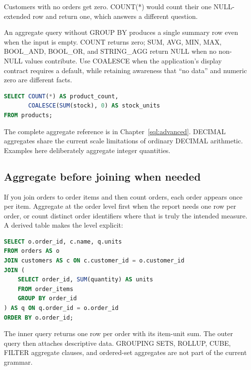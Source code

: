 Customers with no orders get zero. COUNT(*) would count their one NULL-extended row and return one, which answers a different question.

An aggregate query without GROUP BY produces a single summary row even when the input is empty. COUNT returns zero; SUM, AVG, MIN, MAX, BOOL\_AND, BOOL\_OR, and STRING\_AGG return NULL when no non-NULL values contribute. Use COALESCE when the application's display contract requires a default, while retaining awareness that ``no data'' and numeric zero are different facts.

\begin{lstlisting}[language=SQL]
SELECT COUNT(*) AS product_count,
       COALESCE(SUM(stock), 0) AS stock_units
FROM products;
\end{lstlisting}

The complete aggregate reference is in Chapter~\ref{sql:advanced}. DECIMAL aggregates share the current scale limitations of ordinary DECIMAL arithmetic. Examples here deliberately aggregate integer quantities.

\subsection{Aggregate before joining when needed}

If you join orders to order items and then count orders, each order appears once per item. Aggregate at the order level first when the report needs one row per order, or count distinct order identifiers where that is truly the intended measure. A derived table makes the level explicit:

\begin{lstlisting}[language=SQL]
SELECT o.order_id, c.name, q.units
FROM orders AS o
JOIN customers AS c ON c.customer_id = o.customer_id
JOIN (
    SELECT order_id, SUM(quantity) AS units
    FROM order_items
    GROUP BY order_id
) AS q ON q.order_id = o.order_id
ORDER BY o.order_id;
\end{lstlisting}

The inner query returns one row per order with its item-unit sum. The outer query then attaches descriptive data. GROUPING SETS, ROLLUP, CUBE, FILTER aggregate clauses, and ordered-set aggregates are not part of the current grammar.


